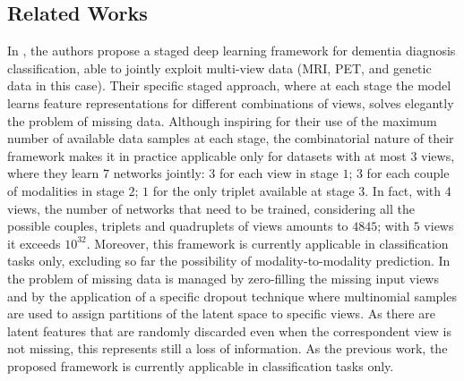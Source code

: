 \subsection{Related Works}
In \cite{Zhou2019a}, the authors propose a staged deep learning framework for dementia diagnosis classification, able to jointly exploit multi-view data (MRI, PET, and genetic data in this case).
Their specific staged approach, where at each stage the model learns feature representations for different combinations of views, solves elegantly the problem of missing data.
Although inspiring for their use of the maximum number of available data samples at each stage,
the combinatorial nature of their framework makes it in practice applicable only for datasets with at most $3$ views, where they learn $7$ networks jointly:
$3$ for each view in stage $1$;
$3$ for each couple of modalities in stage $2$;
$1$ for the only triplet available at stage $3$.
In fact, with $4$ views, the number of networks that need to be trained, considering all the possible couples, triplets and quadruplets of views amounts to $4845$;
with $5$ views it exceeds $10^{32}$. 
Moreover, this framework is currently applicable in classification tasks only, excluding so far the possibility of modality-to-modality prediction.
In \cite{embracenet} the problem of missing data is managed by zero-filling the missing input views and by the application of a specific dropout technique where multinomial samples are used to assign partitions of the latent space to specific views.
As there are latent features that are randomly discarded even when the correspondent view is not missing, this represents still a loss of information.
As the previous work, the proposed framework is currently applicable in classification tasks only.

